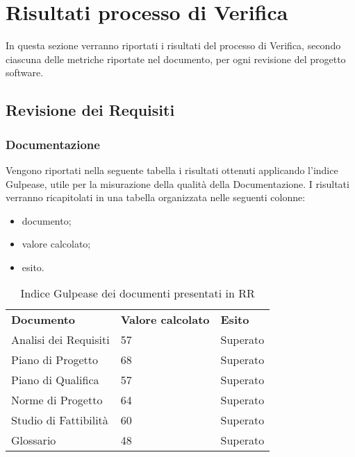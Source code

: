 \appendix
\section{Risultati processo di Verifica}
In questa sezione verranno riportati i risultati del processo di Verifica, secondo ciascuna delle metriche riportate nel documento, per ogni revisione del progetto software.

\subsection{Revisione dei Requisiti}
\subsubsection{Documentazione}
Vengono riportati nella seguente tabella i risultati ottenuti applicando l'indice Gulpease, utile per la misurazione della qualità della Documentazione. I risultati verranno ricapitolati in una tabella organizzata nelle seguenti colonne:
\begin{itemize}
	\item documento;
	\item valore calcolato;
	\item esito.
\end{itemize}

\renewcommand{\arraystretch}{2.2}
\begin{longtable}{|C{5.5cm}|C{2cm}|C{4.5cm}|}
	
	\caption{Indice Gulpease dei documenti presentati in RR}\\
	\hline
	
	\textbf{Documento} & \textbf{Valore calcolato}  & \textbf{Esito} 
	\tabularnewline
	\endhead
	
	Analisi dei Requisiti & 57  & Superato \\
	Piano di Progetto & 68  & Superato \\
	Piano di Qualifica & 57  & Superato \\ 
	Norme di Progetto & 64  & Superato\\	
	Studio di Fattibilità & 60  & Superato\\
	Glossario & 48 & Superato\\
\end{longtable}